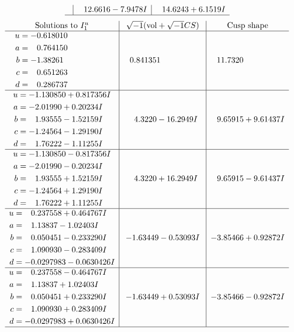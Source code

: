 \documentclass[1p]{elsarticle_modified}
\theoremstyle{definition}
\newcommand{\I}{\sqrt{-1}}
\begin{document}
$$\begin{array}{c|c|c}
 & \phantom{-}12.6616 - 7.9478 I & \phantom{-}14.6243 + 6.1519 I\\
 \hline 
 \end{array}$$\newpage$$\begin{array}{c|c|c}  
\text{Solutions to }I^u_{1}& \I (\text{vol} + \sqrt{-1}CS) & \text{Cusp shape}\\
 \hline 
\begin{aligned}
u &= -0.618010\phantom{ +0.000000I} \\
a &= \phantom{-}0.764150\phantom{ +0.000000I} \\
b &= -1.38261\phantom{ +0.000000I} \\
c &= \phantom{-}0.651263\phantom{ +0.000000I} \\
d &= \phantom{-}0.286737\phantom{ +0.000000I}\end{aligned}
 & \phantom{-}0.841351\phantom{ +0.000000I} & \phantom{-}11.7320\phantom{ +0.000000I} \\ \hline\begin{aligned}
u &= -1.130850 + 0.817356 I \\
a &= -2.01990 + 0.20234 I \\
b &= \phantom{-}1.93555 - 1.52159 I \\
c &= -1.24564 - 1.29190 I \\
d &= \phantom{-}1.76222 - 1.11255 I\end{aligned}
 & \phantom{-}4.3220 - 16.2949 I & \phantom{-}9.65915 + 9.61437 I \\ \hline\begin{aligned}
u &= -1.130850 - 0.817356 I \\
a &= -2.01990 - 0.20234 I \\
b &= \phantom{-}1.93555 + 1.52159 I \\
c &= -1.24564 + 1.29190 I \\
d &= \phantom{-}1.76222 + 1.11255 I\end{aligned}
 & \phantom{-}4.3220 + 16.2949 I & \phantom{-}9.65915 - 9.61437 I \\ \hline\begin{aligned}
u &= \phantom{-}0.237558 + 0.464767 I \\
a &= \phantom{-}1.13837 - 1.02403 I \\
b &= \phantom{-}0.050451 - 0.233290 I \\
c &= \phantom{-}1.090930 - 0.283409 I \\
d &= -0.0297983 - 0.0630426 I\end{aligned}
 & -1.63449 - 0.53093 I & -3.85466 + 0.92872 I \\ \hline\begin{aligned}
u &= \phantom{-}0.237558 - 0.464767 I \\
a &= \phantom{-}1.13837 + 1.02403 I \\
b &= \phantom{-}0.050451 + 0.233290 I \\
c &= \phantom{-}1.090930 + 0.283409 I \\
d &= -0.0297983 + 0.0630426 I\end{aligned}
 & -1.63449 + 0.53093 I & -3.85466 - 0.92872 I\\
 \hline 
 \end{array}$$\newpage\newpage\renewcommand{\arraystretch}{1}
\end{document}
